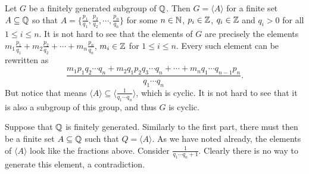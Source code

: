 \begin{solution}
	Let $G$ be a finitely generated subgroup of $\mathbb{Q}$. Then $G = \langle A \rangle$ for a finite set $A \subseteq \mathbb{Q}$ so that $A = \{ \frac{p_1}{q_1}, \frac{p_2}{q_2}, \cdots, \frac{p_n}{q_n} \}$ for some $n \in \mathbb{N}$, $p_i \in \mathbb{Z}$, $q_i \in \mathbb{Z}$ and $q_i > 0$ for all $1 \leq i \leq n$. It is not hard to see that the elements of $G$ are precisely the elements $m_1 \frac{p_1}{q_1} + m_2 \frac{p_2}{q_2} + \cdots + m_n \frac{p_n}{q_n}$, $m_i \in \mathbb{Z}$ for $1 \leq i \leq n$. Every such element can be rewritten as
	\[
		\frac{m_1 p_1 q_2 \cdots q_n + m_2 q_1 p_2 q_3 \cdots q_n + \cdots + m_n q_1 \cdots q_{n-1} p_n }{q_1 \cdots q_n} \text{.}
	\]
	But notice that means $\langle A \rangle \subseteq \langle \frac{1}{q_1 \cdots q_n} \rangle$, which is cyclic. It is not hard to see that it is also a subgroup of this group, and thus $G$ is cyclic.
	
	Suppose that $\mathbb{Q}$ is finitely generated. Similarly to the first part, there must then be a finite set $A \subseteq \mathbb{Q}$ such that $Q = \langle A \rangle$. As we have noted already, the elements of $\langle A \rangle$ look like the fractions above. Consider $\frac{1}{q_1 \cdots q_n + 1}$. Clearly there is no way to generate this element, a contradiction.
\end{solution}